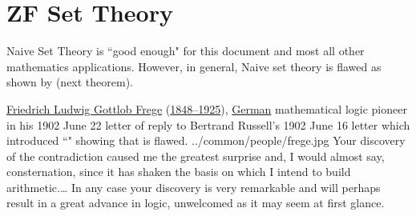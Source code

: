﻿%

\chapter{ZF Set Theory}
\label{chp:zfset}
Naive Set Theory is ``good enough" for this document
and most all other mathematics applications.
However, in general, Naive set theory is flawed as shown by
 (next theorem).



\qboxnps
  {
    \href{http://www-groups.dcs.st-and.ac.uk/~history/Biographies/Frege.html}{Friedrich Ludwig Gottlob Frege} 
    (\href{http://www-history.mcs.st-andrews.ac.uk/Timelines/TimelineF.html}{1848--1925}), 
    \href{http://www-history.mcs.st-andrews.ac.uk/BirthplaceMaps/Places/Germany.html}{German}
    mathematical logic pioneer  \\
    in his 1902 June 22 letter of reply to Bertrand Russell's 1902 June 16 letter which introduced 
    ``" showing that  is flawed.
    \footnotemark
  }
  {../common/people/frege.jpg}
  {Your discovery of the contradiction caused me the greatest surprise and,
   I would almost say, consternation, since it has shaken the basis on which I intend
   to build arithmetic.\ldots 
   In any case your discovery is very remarkable and will perhaps result in a great
   advance in logic, unwelcomed as it may seem at first glance.}

